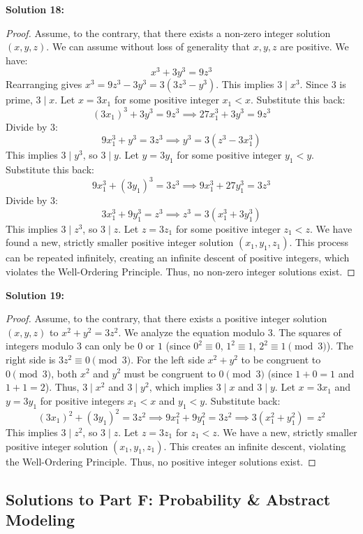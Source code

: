 \documentclass[11pt]{article}
\theoremstyle{definition}
\begin{document}
\textbf{Solution 18:}
\begin{proof}
Assume, to the contrary, that there exists a non-zero integer solution $(x, y, z)$. We can assume without loss of generality that $x, y, z$ are positive. We have:
\[ x^3 + 3y^3 = 9z^3 \]
Rearranging gives $x^3 = 9z^3 - 3y^3 = 3(3z^3 - y^3)$. This implies $3 \mid x^3$. Since $3$ is prime, $3 \mid x$. Let $x = 3x_1$ for some positive integer $x_1 < x$. Substitute this back:
\[ (3x_1)^3 + 3y^3 = 9z^3 \implies 27x_1^3 + 3y^3 = 9z^3 \]
Divide by $3$:
\[ 9x_1^3 + y^3 = 3z^3 \implies y^3 = 3(z^3 - 3x_1^3) \]
This implies $3 \mid y^3$, so $3 \mid y$. Let $y = 3y_1$ for some positive integer $y_1 < y$. Substitute this back:
\[ 9x_1^3 + (3y_1)^3 = 3z^3 \implies 9x_1^3 + 27y_1^3 = 3z^3 \]
Divide by $3$:
\[ 3x_1^3 + 9y_1^3 = z^3 \implies z^3 = 3(x_1^3 + 3y_1^3) \]
This implies $3 \mid z^3$, so $3 \mid z$. Let $z = 3z_1$ for some positive integer $z_1 < z$. We have found a new, strictly smaller positive integer solution $(x_1, y_1, z_1)$. This process can be repeated infinitely, creating an infinite descent of positive integers, which violates the Well-Ordering Principle. Thus, no non-zero integer solutions exist.
\end{proof}

\textbf{Solution 19:}
\begin{proof}
Assume, to the contrary, that there exists a positive integer solution $(x, y, z)$ to $x^2 + y^2 = 3z^2$. We analyze the equation modulo $3$. The squares of integers modulo $3$ can only be $0$ or $1$ (since $0^2 \equiv 0$, $1^2 \equiv 1$, $2^2 \equiv 1 \pmod{3}$). 
The right side is $3z^2 \equiv 0 \pmod{3}$. 
For the left side $x^2 + y^2$ to be congruent to $0 \pmod{3}$, both $x^2$ and $y^2$ must be congruent to $0 \pmod{3}$ (since $1+0=1$ and $1+1=2$). 
Thus, $3 \mid x^2$ and $3 \mid y^2$, which implies $3 \mid x$ and $3 \mid y$. Let $x = 3x_1$ and $y = 3y_1$ for positive integers $x_1 < x$ and $y_1 < y$. Substitute back:
\[ (3x_1)^2 + (3y_1)^2 = 3z^2 \implies 9x_1^2 + 9y_1^2 = 3z^2 \implies 3(x_1^2 + y_1^2) = z^2 \]
This implies $3 \mid z^2$, so $3 \mid z$. Let $z = 3z_1$ for $z_1 < z$. We have a new, strictly smaller positive integer solution $(x_1, y_1, z_1)$. This creates an infinite descent, violating the Well-Ordering Principle. Thus, no positive integer solutions exist.
\end{proof}

\subsection*{Solutions to Part F: Probability \& Abstract Modeling}
\end{document}

